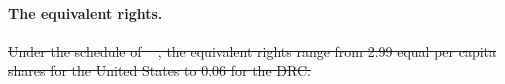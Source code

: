 \documentclass[12pt,english]{article}
\theoremstyle{remark}
\providecommand{\DIFdeltex}[1]{{\protect\color{red}\sout{#1}}}                      %
\providecommand{\DIFdelbegin}{} %
\providecommand{\DIFdelend}{} %
\providecommand{\DIFdel}[1]{\texorpdfstring{\DIFdeltex{#1}}{}} %
\newcommand{\DIFscaledelfig}{0.5}
\newlength{\DIFdelgraphicswidth} %
\newlength{\DIFdelgraphicsheight} %
\newcommand{\DIFdelincludegraphics}[2][]{%
\sbox{\DIFdelgraphicsbox}{\DIFOincludegraphics[#1]{#2}}%
\settoboxwidth{\DIFdelgraphicswidth}{\DIFdelgraphicsbox} %
\settoboxtotalheight{\DIFdelgraphicsheight}{\DIFdelgraphicsbox} %
\scalebox{\DIFscaledelfig}{%
\parbox[b]{\DIFdelgraphicswidth}{\usebox{\DIFdelgraphicsbox}\\[-\baselineskip] \rule{\DIFdelgraphicswidth}{0em}}\llap{\resizebox{\DIFdelgraphicswidth}{\DIFdelgraphicsheight}{%
\setlength{\unitlength}{\DIFdelgraphicswidth}%
\begin{picture}(1,1)%
\thicklines\linethickness{2pt} %
{\color[rgb]{1,0,0}\put(0,0){\framebox(1,1){}}}%
{\color[rgb]{1,0,0}\put(0,0){\line( 1,1){1}}}%
{\color[rgb]{1,0,0}\put(0,1){\line(1,-1){1}}}%
\end{picture}%
}\hspace*{3pt}}} %
} %
\DeclareRobustCommand{\DIFdelbegin}{\DIFOdelbegin \let\includegraphics\DIFdelincludegraphics} %
\DeclareRobustCommand{\DIFdelend}{\DIFOaddend \let\includegraphics\DIFOincludegraphics} %
\begin{document}




\paragraph{The equivalent rights.} 
\DIFdelbegin \DIFdel{Under the schedule of \mbox{%
\citet{banerjee_grand_2025}}\hskip0pt%
, the equivalent rights range from 2.99 equal per capita shares for the United States to 0.06 for the DRC. 
}\DIFdelend 
\end{document}
